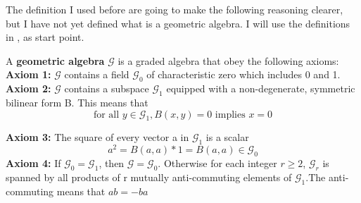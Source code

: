 The definition I used before are going to make the following reasoning clearer, but I have not yet defined what is a geometric algebra. I will use the definitions in \cite{Chisolm12}, \cite{Kilpatrick14} as start point.

\begin{definition}
A \textbf{geometric algebra} $\mathcal{G}$ is a graded algebra that obey the following axioms:
\hfill\newline \hfill\newline
\textbf{Axiom 1:} $\mathcal{G}$ contains a field $\mathcal{G}_0$ of characteristic zero which includes 0 and 1.
\hfill\newline \hfill\newline
\textbf{Axiom 2:} $\mathcal{G}$ contains a subspace $\mathcal{G}_1$ equipped with a non-degenerate, symmetric bilinear form B. This means that 
\begin{equation*}
\mbox{for all } y  \in \mathcal{G}_1, B(x,y) = 0 \mbox{ implies } x=0
\end{equation*}

\hfill\newline \hfill\newline
\textbf{Axiom 3:} The square of every vector a in $\mathcal{G}_1$ is a scalar
\begin{equation*}
a^2 = B(a,a)*1 = B(a,a) \in \mathcal{G}_0
\end{equation*}
\hfill\newline \hfill\newline
\textbf{Axiom 4:}  If $\mathcal{G}_0 = \mathcal{G}_1$, then $\mathcal{G} = \mathcal{G}_0$. Otherwise for each integer $r \ge 2$, $\mathcal{G}_r$ is spanned by all products of r mutually anti-commuting elements of $\mathcal{G}_1$.The anti-commuting means that $ab = -ba$

\end{definition}



